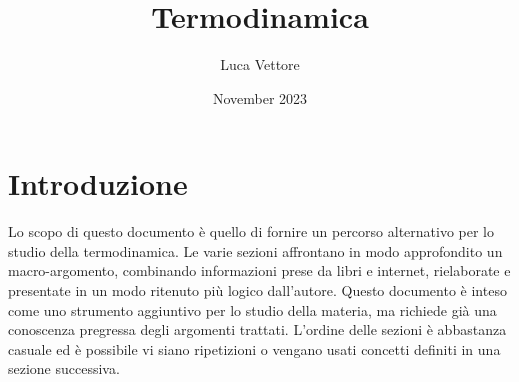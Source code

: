 \documentclass{article}
\title{Termodinamica}
\author{Luca Vettore}
\date{November 2023}
\begin{document}


\maketitle

\section{Introduzione}
Lo scopo di questo documento è quello di fornire un percorso alternativo per lo studio della termodinamica. Le varie sezioni affrontano in modo approfondito un macro-argomento, combinando informazioni prese da libri e internet, rielaborate e presentate in un modo ritenuto più logico dall'autore. Questo documento è inteso come uno strumento aggiuntivo per lo studio della materia, ma richiede già una conoscenza pregressa degli argomenti trattati. L'ordine delle sezioni è abbastanza casuale ed è possibile vi siano ripetizioni o vengano usati concetti definiti in una sezione successiva.
\end{document}
